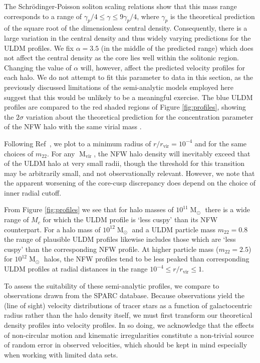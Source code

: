 \documentclass{pasa}%
\begin{document}
The  Schr{\"o}dinger-Poisson soliton scaling relations show that this mass range corresponds to a range of $ \gamma_p /4 \leq \gamma \leq 9\gamma_p/4$, where $\gamma_p$ is the theoretical prediction of the square root of the dimensionless central density. Consequently, there is a large variation in the central density and thus widely varying predictions for the ULDM profiles. We fix $\alpha = 3.5$ (in the middle of the predicted range) which does not affect the central density as the core lies well within the solitonic region. Changing the value of $\alpha$ will, however, affect the predicted velocity profiles for each halo. We do not attempt to fit this parameter to data in this section, as the previously discussed limitations of the semi-analytic models employed here suggest that this would be unlikely to be a meaningful exercise. The blue ULDM profiles are compared to the red shaded regions of Figure \ref{fig:profiles}, showing the $2\sigma$ variation about the theoretical prediction for the concentration parameter of the NFW halo with the same virial mass \cite{Maccio:2008pcd}. 


Following Ref~\cite{Robles:2018fur}, we plot to a minimum radius of $r/r_{\mathrm{vir}} = 10^{-4}$ and for the same choices of $m_{22}$. For any $\operatorname{M}_{\mathrm{vir}}$, the NFW halo density  will inevitably exceed that of the ULDM halo at very small radii, though the threshold for this transition may be arbitrarily small, and not observationally relevant. However, we note that the apparent worsening of the core-cusp discrepancy does depend on the choice of inner radial cutoff.

From Figure \ref{fig:profiles} we see that for halo masses of $10^{11}\operatorname{M}_{\odot}$ there is a wide range of $M_c$ for which the ULDM profile is `less cuspy' than its NFW counterpart. For a halo mass of $10^{12}\operatorname{M}_{\odot}$ and a ULDM particle mass $m_{22}=0.8$ the range of plausible ULDM profiles likewise includes those which are `less cuspy' than the corresponding NFW profile. At higher particle mass ($m_{22}=2.5$) for $10^{12}\operatorname{M}_{\odot}$ halos, the NFW profiles tend to be less peaked than corresponding ULDM profiles at radial distances in  the range $10^{-4}\leq r/r_{\mathrm{vir}} \leq 1$.  

To assess the suitability of these semi-analytic profiles, we compare to observations drawn from the SPARC database. Because observations yield the (line of sight) velocity distributions of tracer stars as a function of galactocentric radius rather than the halo density itself, we must first transform our theoretical density profiles into velocity profiles. In so doing, we acknowledge that the effects of non-circular motion and kinematic irregularities constitute a non-trivial source of random error in observed velocities, which should be kept in mind especially when working with limited data sets. 
\end{document}
